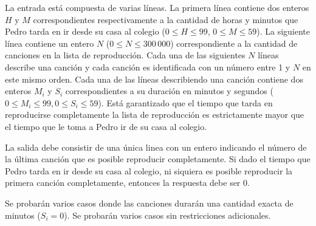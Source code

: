 \documentclass{oci}
\begin{document}
\begin{inputDescription}
  La entrada está compuesta de varias líneas.
  La primera línea contiene dos enteros $H$ y $M$ correspondientes
  respectivamente a la cantidad de horas y minutos que Pedro tarda en ir desde su
  casa al colegio ($0\leq H\leq 99$, $0\leq M\leq 59$).
  La siguiente línea contiene un entero $N$ ($0\leq N\leq 300\,000$)
  correspondiente a la cantidad de canciones en la lista de reproducción.
  Cada una de las siguientes $N$ líneas describe una canción y cada canción es
  identificada con un número entre 1 y $N$ en este mismo orden.
  Cada una de las líneas describiendo una canción contiene dos enteros $M_i$ y $S_i$
  correspondientes a su duración en minutos y segundos ($0\leq
  M_i\leq 99, 0\leq S_i\leq 59$).
  Está garantizado que el tiempo que tarda en reproducirse completamente la
  lista de reproducción es estrictamente mayor que el tiempo que le toma a Pedro
  ir de su casa al colegio.
\end{inputDescription}

\begin{outputDescription}
  La salida debe consistir de una única linea con un entero indicando el número 
  de la última canción que es posible reproducir completamente.
  Si dado el tiempo que Pedro tarda en ir desde su casa al colegio, ni siquiera
  es posible reproducir la primera canción completamente, entonces la respuesta
  debe ser 0.
\end{outputDescription}

\begin{scoreDescription}
   Se probarán varios casos donde las canciones durarán una cantidad
  exacta de minutos ($S_i = 0$).
   Se probarán varios casos sin restricciones adicionales. 
\end{scoreDescription}

\begin{sampleDescription}
\end{sampleDescription}
\end{document}
